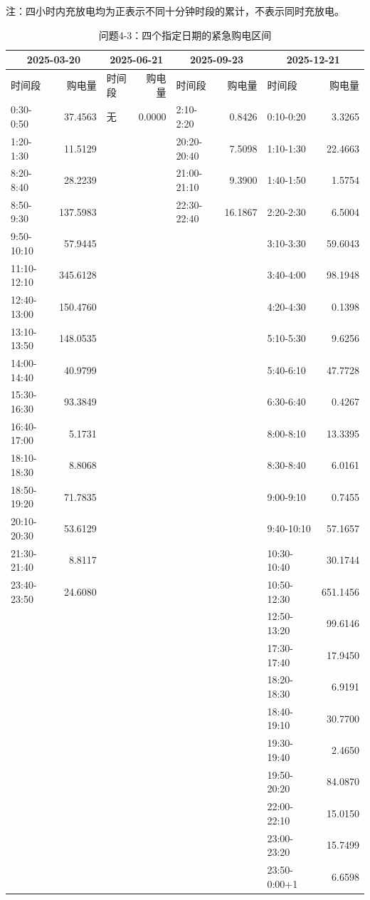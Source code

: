 \raggedright 注：四小时内充放电均为正表示不同十分钟时段的累计，不表示同时充放电。\par\endgroup
\begin{table}[H]\centering\caption{问题4-3：四个指定日期的紧急购电区间}\label{tab:emergency-问题4-3}\fontsize{9}{11}\selectfont\setlength{\tabcolsep}{2pt}\begin{tabular}{|lr|lr|lr|lr|}\hline
\multicolumn{2}{|c|}{2025-03-20} & \multicolumn{2}{|c|}{2025-06-21} & \multicolumn{2}{|c|}{2025-09-23} & \multicolumn{2}{|c|}{2025-12-21}\\\hline
时间段&购电量&时间段&购电量&时间段&购电量&时间段&购电量\\\hline
0:30-0:50 & 37.4563 & 无 & 0.0000 & 2:10-2:20 & 0.8426 & 0:10-0:20 & 3.3265\\
1:20-1:30 & 11.5129 &  &  & 20:20-20:40 & 7.5098 & 1:10-1:30 & 22.4663\\
8:20-8:40 & 28.2239 &  &  & 21:00-21:10 & 9.3900 & 1:40-1:50 & 1.5754\\
8:50-9:30 & 137.5983 &  &  & 22:30-22:40 & 16.1867 & 2:20-2:30 & 6.5004\\
9:50-10:10 & 57.9445 &  &  &  &  & 3:10-3:30 & 59.6043\\
11:10-12:10 & 345.6128 &  &  &  &  & 3:40-4:00 & 98.1948\\
12:40-13:00 & 150.4760 &  &  &  &  & 4:20-4:30 & 0.1398\\
13:10-13:50 & 148.0535 &  &  &  &  & 5:10-5:30 & 9.6256\\
14:00-14:40 & 40.9799 &  &  &  &  & 5:40-6:10 & 47.7728\\
15:30-16:30 & 93.3849 &  &  &  &  & 6:30-6:40 & 0.4267\\
16:40-17:00 & 5.1731 &  &  &  &  & 8:00-8:10 & 13.3395\\
18:10-18:30 & 8.8068 &  &  &  &  & 8:30-8:40 & 6.0161\\
18:50-19:20 & 71.7835 &  &  &  &  & 9:00-9:10 & 0.7455\\
20:10-20:30 & 53.6129 &  &  &  &  & 9:40-10:10 & 57.1657\\
21:30-21:40 & 8.8117 &  &  &  &  & 10:30-10:40 & 30.1744\\
23:40-23:50 & 24.6080 &  &  &  &  & 10:50-12:30 & 651.1456\\
 &  &  &  &  &  & 12:50-13:20 & 99.6146\\
 &  &  &  &  &  & 17:30-17:40 & 17.9450\\
 &  &  &  &  &  & 18:20-18:30 & 6.9191\\
 &  &  &  &  &  & 18:40-19:10 & 30.7700\\
 &  &  &  &  &  & 19:30-19:40 & 2.4650\\
 &  &  &  &  &  & 19:50-20:20 & 84.0870\\
 &  &  &  &  &  & 22:00-22:10 & 15.0150\\
 &  &  &  &  &  & 23:00-23:20 & 15.7499\\
 &  &  &  &  &  & 23:50-0:00+1 & 6.6598\\
\hline\end{tabular}\end{table}

